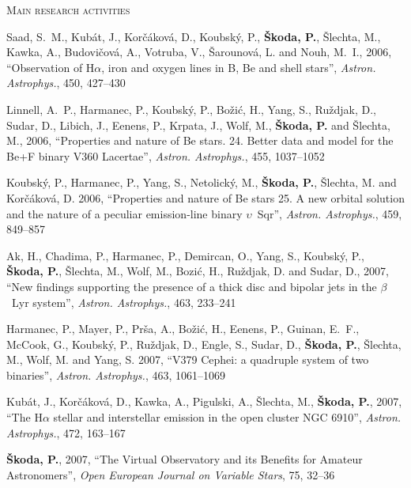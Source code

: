 \begin{cv}
\begin{cvlist}{\large \textsc{Main research activities}}
\item Saad, S.~M., Kub\'at, J., Kor\v{c}\'akov\'a, D., Koubsk\'y, P., {\bf
\v{S}koda, P.}, \v{S}lechta, M., Kawka, A., Budovi\v{c}ov\'a, A., Votruba, V.,
\v{S}arounov\'a, L. and Nouh, M.~I., 2006, ``Observation of H{$\alpha$}, iron
and oxygen lines in B, Be and shell stars'', {\em Astron. Astrophys.\/}, 450,
427--430

\item {Linnell}, A.~P., {Harmanec}, P., {Koubsk{\'y}}, P., {Bo{\v z}i{\'c}},
H., {Yang}, S., {Ru{\v z}djak}, D., {Sudar}, D., {Libich}, J., {Eenens}, P.,
{Krpata}, J., {Wolf}, M., {\bf {\v S}koda, P.} and {{\v S}lechta}, M., 2006,
``Properties and nature of Be stars. 24. Better data and model for the Be+F
binary V360 Lacertae'', {\em Astron. Astrophys.\/}, 455, 1037--1052


\item Koubsk\'y, P., Harmanec, P., Yang, S., Netolick\'y, M., {\bf \v{S}koda,
P.}, \v{S}lechta, M. and Kor\v{c}\'akov\'a, D. 2006, ``Properties and nature of
Be stars 25. A new orbital solution and the nature of a peculiar emission-line
binary $\upsilon$~Sqr'', {\em Astron. Astrophys.\/}, 459, 849--857

\item Ak, H., Chadima, P., Harmanec, P., Demircan, O., Yang, S., Koubsk\'y, P.,
{\bf \v{S}koda, P.}, \v{S}lechta, M., Wolf, M., Bozi\'c, H., Ru\v{z}djak, D. and
Sudar, D., 2007, ``New findings supporting the presence of a thick disc and
bipolar jets in the $\beta$~Lyr system'', {\em Astron. Astrophys.\/}, 463,
233--241

\item Harmanec, P., Mayer, P., {Pr{\v s}a}, A., {Bo{\v z}i{\'c}}, H., {Eenens},
P., {Guinan}, E.~F., {McCook}, G., {Koubsk{\'y}}, P., {Ru{\v z}djak}, D.,
{Engle}, S., {Sudar}, D., {\bf {\v S}koda, P.}, {{\v S}lechta}, M., {Wolf}, M.
and {Yang}, S. 2007, ``V379 Cephei: a quadruple system of two binaries'',
{\em Astron. Astrophys.\/}, 463, 1061--1069

\item Kub\'at, J., Kor\v{c}\'akov\'a, D., Kawka, A., Pigulski, A., \v{S}lechta,
M., {\bf \v{S}koda, P.}, 2007, {``The H$\alpha$ stellar and interstellar
emission in the open cluster NGC 6910''}, {\em Astron.  Astrophys.}, 
472, 163--167

\item {\bf \v{S}koda, P.}, 2007, {``The Virtual Observatory and its Benefits 
for Amateur Astronomers''}, {\em Open European Journal on Variable Stars}, 75, 32--36



\end{cvlist}
\end{cv}
